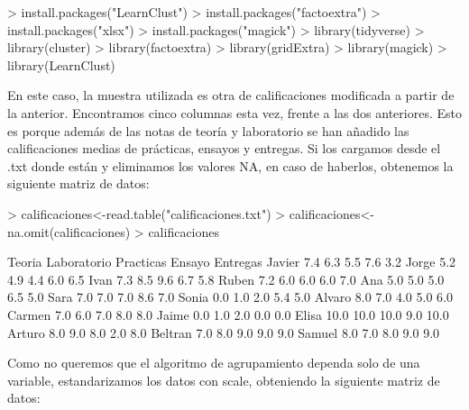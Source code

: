 \documentclass[a4paper]{article}
\begin{document}
\begin{Schunk}
\begin{Sinput}
> install.packages("LearnClust")
> install.packages("factoextra")
> install.packages("xlsx")
> install.packages("magick")
> library(tidyverse)
> library(cluster)
> library(factoextra)
> library(gridExtra)
> library(magick)
> library(LearnClust)
\end{Sinput}
\end{Schunk}

En este caso, la muestra utilizada es otra de calificaciones modificada a partir de la anterior. Encontramos cinco columnas esta vez, frente a las dos anteriores. Esto es porque además de las notas de teoría y laboratorio se han añadido las calificaciones medias de prácticas, ensayos y entregas.
Si los cargamos desde el .txt donde están y eliminamos los valores NA, en caso de haberlos, obtenemos la siguiente matriz de datos:

\begin{Schunk}
\begin{Sinput}
> calificaciones<-read.table("calificaciones.txt")
> calificaciones<-na.omit(calificaciones)
> calificaciones
\end{Sinput}
\begin{Soutput}
        Teoria Laboratorio Practicas Ensayo Entregas
Javier     7.4         6.3       5.5    7.6      3.2
Jorge      5.2         4.9       4.4    6.0      6.5
Ivan       7.3         8.5       9.6    6.7      5.8
Ruben      7.2         6.0       6.0    6.0      7.0
Ana        5.0         5.0       5.0    6.5      5.0
Sara       7.0         7.0       7.0    8.6      7.0
Sonia      0.0         1.0       2.0    5.4      5.0
Alvaro     8.0         7.0       4.0    5.0      6.0
Carmen     7.0         6.0       7.0    8.0      8.0
Jaime      0.0         1.0       2.0    0.0      0.0
Elisa     10.0        10.0      10.0    9.0     10.0
Arturo     8.0         9.0       8.0    2.0      8.0
Beltran    7.0         8.0       9.0    9.0      9.0
Samuel     8.0         7.0       8.0    9.0      9.0
\end{Soutput}
\end{Schunk}

Como no queremos que el algoritmo de agrupamiento dependa solo de una variable, estandarizamos los datos con scale, obteniendo la siguiente matriz de datos:
\end{document}
